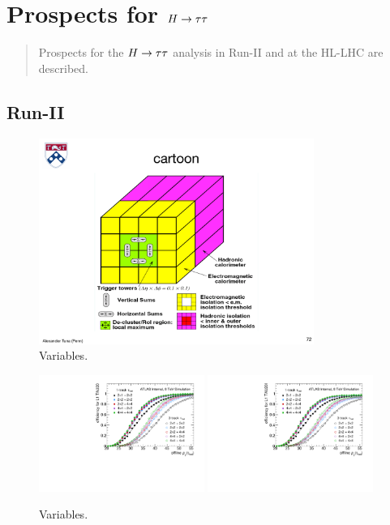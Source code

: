 \chapter[Prospects for $\Htautau$][Prospects for $\Htautau$]{Prospects for $\Htautau$}
\label{chap:prospects}

\begin{quote}
Prospects for the $\Htautau$ analysis in Run-II and at the HL-LHC are described.
\end{quote}

\section{Run-II}
\label{sec:prospects-run2}

\begin{figure}[tp]
  \centering
  \includegraphics[width=0.80\textwidth]{figures/trigger/cartoonL1}
  \caption{Variables.}
  \label{fig:prospects-trigger-cartoonL1}
\end{figure}

\begin{figure}[tp]
  \centering
  \includegraphics[width=0.48\textwidth]{figures/trigger/turnon_L1TAU20_1p3p.pdf}
  \includegraphics[width=0.48\textwidth]{figures/trigger/turnon_L1TAU20I_1p3p.pdf}
  \caption{Variables.}
  \label{fig:prospects-trigger-towersize}
\end{figure}

